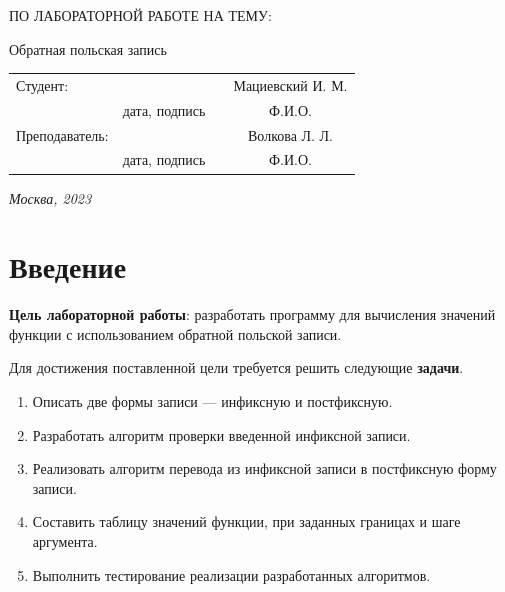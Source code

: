 \documentclass[12pt, a4paper]{article}
\begin{document}
\begin{titlepage}
\begin{center}
\begin{bf}
    \fontsize{20}{30}\selectfont
    ПО ЛАБОРАТОРНОЙ РАБОТЕ НА ТЕМУ:

    Обратная польская запись

   \end{bf}
  \end{center}

  \fontsize{14}{21}\selectfont
  \vspace{5cm}


  \noindent\begin{tabularx}{\textwidth}{ X >{\centering}p{4cm} p{1cm} c }
   Студент: & & & Мациевский И. М. \\ \cline{2-2} \cline{4-4}
   & \fontsize{10}{15}\selectfont дата, подпись & & \fontsize{10}{15}\selectfont Ф.И.О. \\
   Преподаватель: & & & Волкова Л. Л.\\ \cline{2-2} \cline{4-4}
   & \fontsize{10}{15}\selectfont дата, подпись & & \fontsize{10}{15}\selectfont Ф.И.О.
   \end{tabularx}

  \vspace{\fill}

  \begin{center}
   \it{Москва}, 2023
  \end{center}

  \thispagestyle{empty}
\end{titlepage}\newpage
\tableofcontents
\newpage
\section*{Введение}
\justifying
\textbf{Цель лабораторной работы}: разработать программу для вычисления 
значений функции с использованием обратной польской записи.

Для достижения поставленной цели требуется решить следующие \textbf{задачи}.
\begin{enumerate}
\item Описать две формы записи --- инфиксную и постфиксную.
\item Разработать алгоритм проверки введенной инфиксной записи.
\item Реализовать алгоритм перевода из инфиксной записи в постфиксную 
форму записи.
\item Составить таблицу значений функции, при заданных границах и шаге 
аргумента.
\item Выполнить тестирование реализации разработанных алгоритмов.
\end{enumerate}
\newpage
\end{document}
